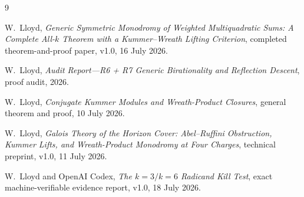 \documentclass[11pt,a4paper]{article}
\theoremstyle{definition}
\theoremstyle{remark}
\begin{document}
{\small
\begin{thebibliography}{9}

W.~Lloyd,
\emph{Generic Symmetric Monodromy of Weighted Multiquadratic Sums: A Complete
All-$k$ Theorem with a Kummer--Wreath Lifting Criterion},
completed theorem-and-proof paper, v1.0, 16 July 2026.

W.~Lloyd,
\emph{Audit Report---R6 + R7 Generic Birationality and Reflection Descent},
proof audit, 2026.

W.~Lloyd,
\emph{Conjugate Kummer Modules and Wreath-Product Closures},
general theorem and proof, 10 July 2026.

W.~Lloyd,
\emph{Galois Theory of the Horizon Cover: Abel--Ruffini Obstruction,
Kummer Lifts, and Wreath-Product Monodromy at Four Charges},
technical preprint, v1.0, 11 July 2026.

W.~Lloyd and OpenAI Codex,
\emph{The $k=3/k=6$ Radicand Kill Test},
exact machine-verifiable evidence report, v1.0, 18 July 2026.

\end{thebibliography}
}
\end{document}
